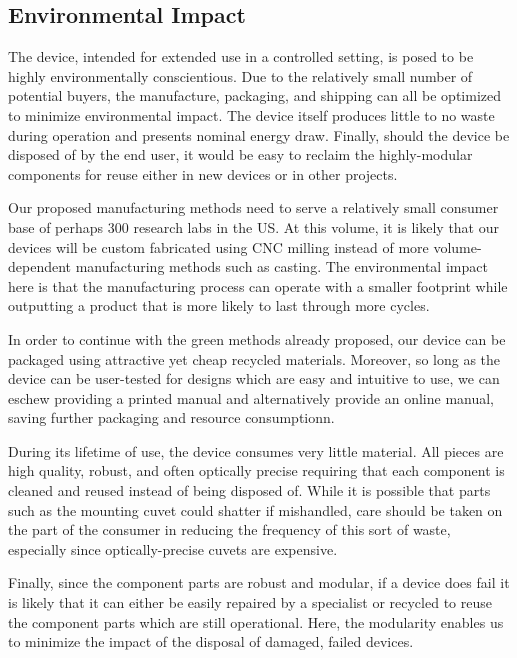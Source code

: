 \documentclass{article}
\begin{document}
\subsection{Environmental Impact}
\label{sec:environment}

The device, intended for extended use in a controlled setting, is
posed to be highly environmentally conscientious. Due to the
relatively small number of potential buyers, the manufacture,
packaging, and shipping can all be optimized to minimize environmental
impact. The device itself produces little to no waste during operation
and presents nominal energy draw. Finally, should the device be
disposed of by the end user, it would be easy to reclaim the
highly-modular components for reuse either in new devices or in other
projects.

Our proposed manufacturing methods need to serve a relatively small
consumer base of perhaps 300 research labs in the US. At this volume,
it is likely that our devices will be custom fabricated using CNC
milling instead of more volume-dependent manufacturing methods such as
casting. The environmental impact here is that the manufacturing
process can operate with a smaller footprint while outputting a
product that is more likely to last through more cycles.

In order to continue with the green methods already proposed, our
device can be packaged using attractive yet cheap recycled
materials. Moreover, so long as the device can be user-tested for
designs which are easy and intuitive to use, we can eschew providing a
printed manual and alternatively provide an online manual, saving
further packaging and resource consumptionn.

During its lifetime of use, the device consumes very little
material. All pieces are high quality, robust, and often optically
precise requiring that each component is cleaned and reused instead of
being disposed of. While it is possible that parts such as the
mounting cuvet could shatter if mishandled, care should be taken on
the part of the consumer in reducing the frequency of this sort of
waste, especially since optically-precise cuvets are expensive.

Finally, since the component parts are robust and modular, if a device
does fail it is likely that it can either be easily repaired by a
specialist or recycled to reuse the component parts which are still
operational. Here, the modularity enables us to minimize the impact of
the disposal of damaged, failed devices.
\end{document}
